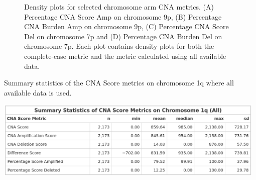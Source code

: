 \begin{figure}[H]
\begin{minipage}{.49\textwidth}
\end{minipage}
\hfill    
\begin{minipage}{.49\textwidth}
\end{minipage}
    \caption[Density plots for selected chromosome arm CNA metrics.]{Density plots for selected chromosome arm CNA metrics. (A) Percentage CNA Score Amp on chromosome 9p, (B) Percentage CNA Burden Amp on chromosome 9p, (C) Percentage CNA Score Del on chromosome 7p and (D) Percentage CNA Burden Del on chromosome 7p. Each plot contains density plots for both the complete-case metric and the metric calculated using all available data.}\label{fig:Plot-PerArm-DensityPlots}
\end{figure} 
\vfill 

\begin{table}[!ht]
\center
\caption[Summary statistics of the CNA Score metrics on chromosome 1q where all available data is used.]{Summary statistics of the CNA Score metrics on chromosome 1q  where all available data is used.}
\includegraphics[width = 0.98\textwidth]{../tables/Chapter_2/CNA_Score_Metric_All_Chr1q_Summary.png}
\label{tab:Score_All_Chr1q}
\end{table}

